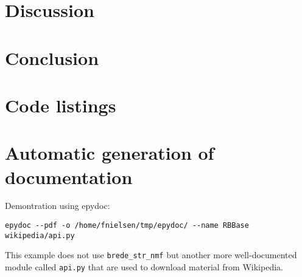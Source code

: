 \documentclass[10pt]{IEEEtran}
\begin{document}
\section{Discussion}



\section{Conclusion}







\clearpage
\onecolumn
\appendices
\section{Code listings}

\lstlistoflistings


\label{listing:brede_str_nmf}


\newpage
\section{Automatic generation of documentation}

Demontration using epydoc:
\begin{verbatim}
epydoc --pdf -o /home/fnielsen/tmp/epydoc/ --name RBBase wikipedia/api.py
\end{verbatim}
This example does not use \verb!brede_str_nmf! but another more
well-documented module called {\tt api.py} that are used to download
material from Wikipedia. 


\end{document}
